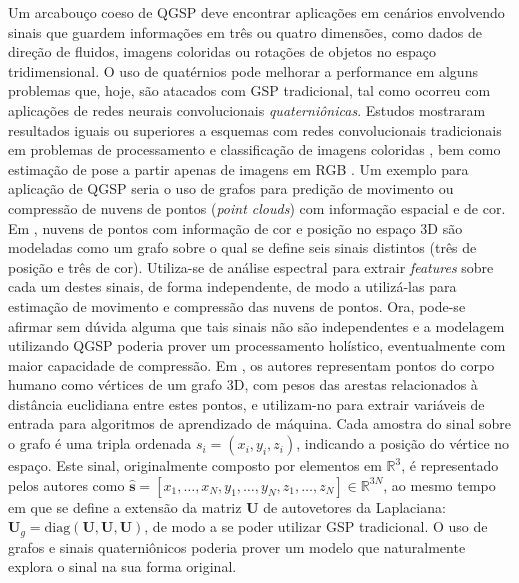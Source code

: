 
Um arcabou\c co coeso de QGSP deve encontrar aplica\c c\~oes em cen\'arios envolvendo sinais que guardem informa\c c\~oes em tr\^es ou quatro dimens\~oes, como dados de dire\c c\~ao de fluidos, imagens coloridas ou rota\c c\~oes de objetos no espa\c co tridimensional. O uso de quat\'ernios pode melhorar a performance em alguns problemas que, hoje, s\~ao atacados com GSP tradicional, tal como ocorreu com aplica\c c\~oes de redes neurais convolucionais \emph{quaterni\^onicas}. Estudos mostraram resultados iguais ou superiores a esquemas com redes convolucionais tradicionais em problemas de processamento e classifica\c c\~ao de imagens coloridas \cite{yin2019quaternion, parcollet2019quaternion}, bem como estima\c c\~ao de pose a partir apenas de imagens em RGB \cite{hsu2018quatnet}. Um exemplo para aplica\c c\~ao de QGSP seria o uso de grafos para predi\c c\~ao de movimento ou compress\~ao de nuvens de pontos (\textit{point clouds}) com informa\c c\~ao espacial e de cor. Em \cite{thanou2016graph}, nuvens de pontos com informa\c c\~ao de cor e posi\c c\~ao no espa\c co 3D s\~ao modeladas como um grafo sobre o qual se define seis sinais distintos (tr\^es de posi\c c\~ao e tr\^es de cor). Utiliza-se de an\'alise espectral para extrair \emph{features} sobre cada um destes sinais, de forma independente, de modo a utiliz\'a-las para estima\c c\~ao de movimento e compress\~ao das nuvens de pontos. Ora, pode-se afirmar sem d\'uvida alguma que tais sinais n\~ao s\~ao independentes e a modelagem utilizando QGSP poderia prover um processamento hol\'istico, eventualmente com maior capacidade de compress\~ao. Em \cite{batabyal2015ugrasp}, os autores representam pontos do corpo humano como v\'ertices de um grafo 3D, com pesos das arestas relacionados \`a dist\^ancia euclidiana entre estes pontos, e utilizam-no para extrair vari\'aveis de entrada para algoritmos de aprendizado de m\'aquina. Cada amostra do sinal sobre o grafo \'e uma tripla ordenada $ s_i = (x_i, y_i, z_i) $, indicando a posi\c c\~ao do v\'ertice no espa\c co. Este sinal, originalmente composto por elementos em $ \mathbb{R}^3 $, \'e representado pelos autores como $ \hat{\mathbf{s}} = [x_1, \dots, x_N, y_1, \dots, y_N, z_1, \dots, z_N] \in \mathbb{R}^{3N}$, ao mesmo tempo em que se define a extens\~ao da matriz $ \mathbf{U} $ de autovetores da Laplaciana: $ \mathbf{U}_g = \text{diag}(\mathbf{U}, \mathbf{U}, \mathbf{U}) $, de modo a se poder utilizar GSP tradicional. O uso de grafos e sinais quaterni\^onicos poderia prover um modelo que naturalmente explora o sinal na sua forma original.
